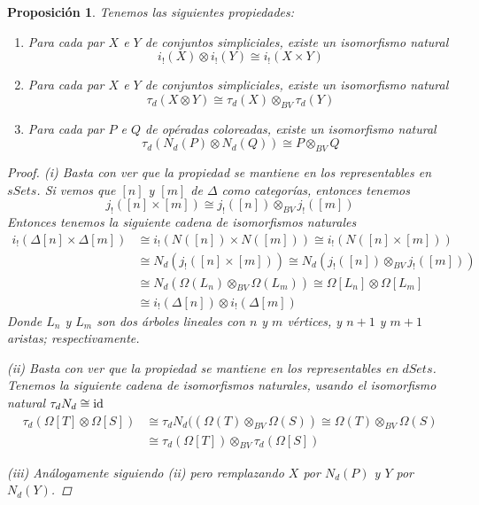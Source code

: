 \documentclass[11pt,a4paper,openright,oneside]{article}
\numberwithin{equation}{section}
\newtheorem{prop}[teo]{Proposici\'on}
\theoremstyle{definition}
\begin{document}
\begin{prop}
    Tenemos las siguientes propiedades:
    \begin{enumerate}
        \item[{\rm (i)}] Para cada par $X$ e $Y$ de conjuntos simpliciales, existe un isomorfismo natural
              $$
                  i_!(X)\otimes i_!(Y) \cong i_!(X\times Y)
              $$
        \item[{\rm (ii)}] Para cada par $X$ e $Y$ de conjuntos simpliciales, existe un isomorfismo natural
              $$
                  \tau_d(X\otimes Y) \cong \tau_d(X) \otimes_{BV} \tau_d(Y)
              $$
        \item[{\rm (iii)}] Para cada par $P$ e $Q$ de op\'eradas coloreadas, existe un isomorfismo natural
              $$
                  \tau_d(N_d(P)\otimes N_d(Q)) \cong P \otimes_{BV} Q
              $$
    \end{enumerate}
    \begin{proof}
        (i) Basta con ver que la propiedad se mantiene en los representables en $sSets$. Si vemos que $[n]$ y $[m]$ de $\Delta$ como categor\'ias, entonces tenemos
        $$
            j_!([n]\times [m]) \cong j_!([n]) \otimes_{BV} j_!([m])
        $$
        Entonces tenemos la siguiente cadena de isomorfismos naturales
        \begin{align*}
            i_!(\Delta[n]\times\Delta[m]) & \cong i_!(N([n])\times N([m]))\cong i_!(N([n]\times[m]))                          \\
                                          & \cong N_d(j_!([n]\times [m])) \cong N_d(j_!([n])\otimes_{BV}j_!([m]))             \\
                                          & \cong N_d(\Omega(L_n)\otimes_{BV}\Omega(L_m)) \cong \Omega[L_n]\otimes\Omega[L_m] \\
                                          & \cong i_!(\Delta[n])\otimes i_!(\Delta[m])
        \end{align*}
        Donde $L_n$ y $L_m$ son dos \'arboles lineales con $n$ y $m$ v\'ertices, y $n+1$ y $m+1$ aristas; respectivamente.

        (ii) Basta con ver que la propiedad se mantiene en los representables en $dSets$. Tenemos la siguiente cadena de isomorfismos naturales, usando el isomorfismo natural $\tau_d N_d\cong \rm id$
        \begin{align*}
            \tau_d(\Omega[T]\otimes\Omega[S]) & \cong \tau_d N_d((\Omega(T)\otimes_{BV}\Omega(S)) \cong \Omega(T)\otimes_{BV}\Omega(S) \\
                                              & \cong \tau_d(\Omega[T])\otimes_{BV}\tau_d(\Omega[S])
        \end{align*}

        (iii) An\'alogamente siguiendo (ii) pero remplazando $X$ por $N_d(P)$ y $Y$ por $N_d(Y)$.
    \end{proof}
\end{prop}
\end{document}
